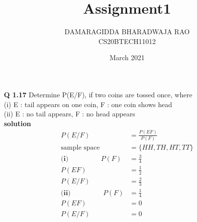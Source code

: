 \documentclass{article}
\title{Assignment1}
\author{DAMARAGIDDA BHARADWAJA RAO\\CS20BTECH11012}
\date{March 2021}
\begin{document}
\maketitle
\begin{multicols*}{2}
\noindent
\textbf{Q 1.17} Determine P(E/F), if two coins are tossed
once, where\\
(i) E : tail appears on one coin, F : one coin
shows head\\
\vspace{0.5cm}
(ii) E : no tail appears, F : no head appears\\
\textbf{solution}\\
\begin{align*}
P(E/F) &= \frac{P(EF)}{P(F)}\\
\text{sample space } &= \{HH , TH , HT , TT\}\\
\textbf{(i)}\hspace{2cm} P(F) &= \frac{3}{4} \\
P(EF) &= \frac{1}{2}\\
P(E/F) &= \frac{2}{3}\\
\textbf{(ii)}\hspace{2cm} P(F) &= \frac{1}{4}\\
P(EF) &= 0\\
P(E/F) &= 0
\end{align*}
\end{multicols*}
\end{document}
